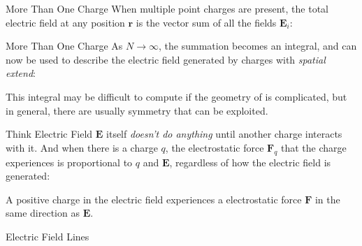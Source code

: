 \documentclass[12pt,aspectratio=169]{beamer}
\begin{document}
\begin{frame}{More Than One Charge}
  When multiple point charges are present, the total electric field at any
  position $\bm{r}$ is the vector sum of all the fields $\bm{E}_i$:
    
\end{frame}



\begin{frame}{More Than One Charge}
  As $N\rightarrow\infty$, the summation becomes an integral, and can now be
  used to describe the electric field generated by charges with
  \emph{spatial extend}:

  
  This integral may be difficult to compute if the geometry of is complicated,
  but in general, there are usually symmetry that can be exploited.
\end{frame}



\begin{frame}{Think Electric Field}
  $\bm{E}$ itself \emph{doesn't do anything} until another charge interacts with
  it. And when there is a charge $q$, the electrostatic force $\bm{F}_q$ that
  the charge experiences is proportional to $q$ and $\bm{E}$, regardless of how
  the electric field is generated:


  \vspace{-.15in}A positive charge in the electric field experiences a
  electrostatic force $\bm{F}$ in the same direction as $\bm{E}$.
\end{frame}



\begin{frame}{Electric Field Lines}
  \begin{columns}
    \\
  \end{columns}
\end{frame}
\end{document}
